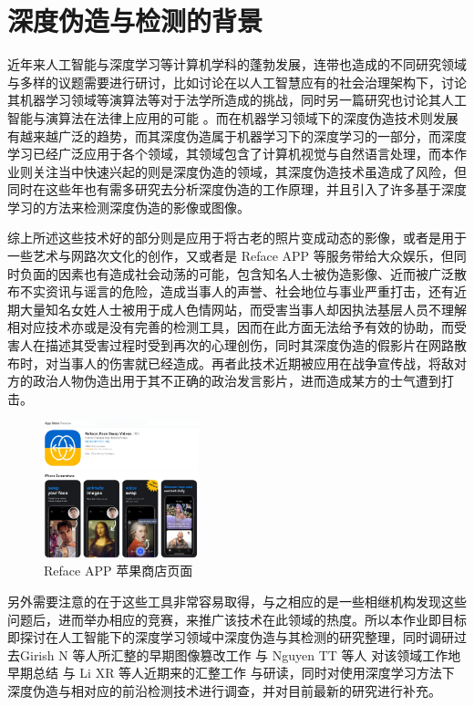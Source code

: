 \chapter{深度伪造与检测的背景}
\label{chap:1}
近年来人工智能与深度学习等计算机学科的蓬勃发展，连带也造成的不同研究领域与多样的议题需要进行研讨，比如讨论在以人工智慧应有的社会治理架构下，讨论其机器学习领域等演算法等对于法学所造成的挑战\cite{law01}，同时另一篇研究也讨论其人工智能与演算法在法律上应用的可能 \cite{law03}。而在机器学习领域下的深度伪造技术则发展有越来越广泛的趋势，而其深度伪造属于机器学习下的深度学习的一部分，而深度学习已经广泛应用于各个领域，其领域包含了计算机视觉与自然语言处理，而本作业则关注当中快速兴起的则是深度伪造的领域，其深度伪造技术\cite{list1101}虽造成了风险，但同时在这些年也有需多研究去分析深度伪造的工作原理，并且引入了许多基于深度学习的方法来检测深度伪造的影像或图像。

综上所述这些技术好的部分则是应用于将古老的照片变成动态的影像，或者是用于一些艺术与网路次文化的创作，又或者是 Reface APP\cite{list1102} 等服务带给大众娱乐，但同时负面的因素也有造成社会动荡的可能，包含知名人士被伪造影像、近而被广泛散布不实资讯与谣言的危险，造成当事人的声誉、社会地位与事业严重打击，还有近期大量知名女姓人士被用于成人色情网站，而受害当事人却因执法基层人员不理解相对应技术亦或是没有完善的检测工具，因而在此方面无法给予有效的协助，而受害人在描述其受害过程时受到再次的心理创伤，同时其深度伪造的假影片在网路散布时，对当事人的伤害就已经造成。再者此技术近期被应用在战争宣传战，将敌对方的政治人物伪造出用于其不正确的政治发言影片，进而造成某方的士气遭到打击。

\begin{figure}[htb]
\centering 
\includegraphics[width=0.40\textwidth]{img/ch1m1.png} 
\caption{Reface APP 苹果商店页面}
\label{Test}
\end{figure}

另外需要注意的在于这些工具非常容易取得，与之相应的是一些相继机构发现这些问题后，进而举办相应的竞赛\cite{list1103}，来推广该技术在此领域的热度。所以本作业即目标即探讨在人工智能下的深度学习领域中深度伪造与其检测的研究整理，同时调研过去Girish N 等人所汇整的早期图像篡改工作 \cite{girish2019review}与 Nguyen TT 等人 对该领域工作地早期总结 \cite{nguyen2019deep}与 Li XR 等人近期来的汇整工作\cite{2021496} 与研读，同时对使用深度学习方法下深度伪造与相对应的前沿检测技术进行调查，并对目前最新的研究进行补充。

